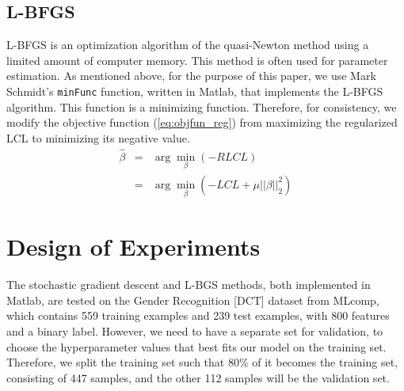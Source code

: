 \documentclass{article} %
\newcommand{\argmin}{\arg\!\min}
\begin{document}
\subsection{L-BFGS}

L-BFGS is an optimization algorithm of the quasi-Newton method using a limited amount of computer memory\cite{wiki_lbfgs}. This method is often used for parameter estimation. As mentioned above, for the purpose of this paper, we use Mark Schmidt's {\tt minFunc} function, written in Matlab, that implements the L-BFGS algorithm. This function is a minimizing function. Therefore, for consistency, we modify the objective function (\ref{eq:objfun_reg}) from maximizing the regularized LCL to minimizing its negative value.
\begin{eqnarray} \label{eq:objfun_reg_minimize}
\hat{\beta}&=&\argmin_{\beta} (- RLCL) \nonumber \\
           &=&\argmin_{\beta} (- LCL + \mu ||\beta||_2^2)
\end{eqnarray}


\section{Design of Experiments}
\label{sec:experiments}



The stochastic gradient descent and L-BGS methods, both implemented in Matlab, are tested on the Gender Recognition [DCT] dataset from MLcomp, which contains 559 training examples and 239 test examples, with 800 features and a binary label. However, we need to have a separate set for validation, to choose the hyperparameter values that best fits our model on the training set. Therefore, we split the training set such that 80\% of it becomes the training set, consisting of 447 samples, and the other 112 samples will be the validation set.
\end{document}
